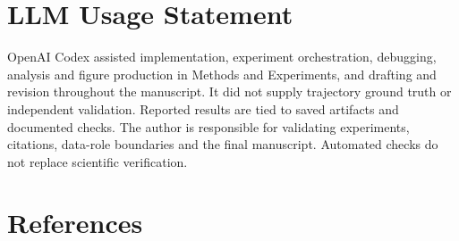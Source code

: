 \documentclass[10pt,twocolumn,letterpaper]{article}
\begin{document}
\section*{LLM Usage Statement}

OpenAI Codex assisted implementation, experiment orchestration, debugging, analysis and figure production in Methods and Experiments, and drafting and revision throughout the manuscript. It did not supply trajectory ground truth or independent validation. Reported results are tied to saved artifacts and documented checks. The author is responsible for validating experiments, citations, data-role boundaries and the final manuscript. Automated checks do not replace scientific verification.


\section*{References}
\end{document}
